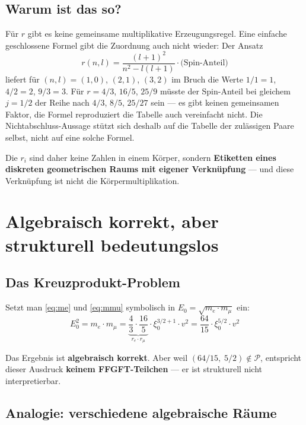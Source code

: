 \subsection{Warum ist das so?}

Für $r$ gibt es keine gemeinsame multiplikative Erzeugungsregel.
Eine einfache geschlossene Formel gibt die Zuordnung auch nicht wieder:
Der Ansatz
\[
  r(n,l) = \frac{(l+1)^2}{n^2 - l(l+1)} \cdot \text{(Spin-Anteil)}
\]
liefert für $(n,l) = (1,0)$, $(2,1)$, $(3,2)$ im Bruch die Werte
$1/1 = 1$, $4/2 = 2$, $9/3 = 3$. Für $r = 4/3$, $16/5$, $25/9$ müsste der
Spin-Anteil bei gleichem $j = 1/2$ der Reihe nach $4/3$, $8/5$, $25/27$
sein --- es gibt keinen gemeinsamen Faktor, die Formel reproduziert die
Tabelle auch vereinfacht nicht. Die Nichtabschluss-Aussage stützt sich
deshalb auf die Tabelle der zulässigen Paare selbst, nicht auf eine
solche Formel.

Die $r_i$ sind daher keine Zahlen in einem Körper, sondern
\textbf{Etiketten eines diskreten geometrischen Raums mit eigener
Verknüpfung} --- und diese Verknüpfung ist nicht die Körpermultiplikation.

\section{Algebraisch korrekt, aber strukturell bedeutungslos}

\subsection{Das Kreuzprodukt-Problem}

Setzt man \eqref{eq:me} und \eqref{eq:mmu} symbolisch in
$E_0 = \sqrt{m_e \cdot m_\mu}$ ein:
\begin{equation}
  E_0^2 = m_e \cdot m_\mu
        = \underbrace{\frac{4}{3} \cdot \frac{16}{5}}_{r_e \cdot r_\mu}
          \cdot \xi_0^{3/2 + 1} \cdot v^2
        = \frac{64}{15} \cdot \xi_0^{5/2} \cdot v^2
  \label{eq:kreuz}
\end{equation}

Das Ergebnis ist \textbf{algebraisch korrekt}. Aber weil
$(64/15,\;5/2) \notin \mathcal{P}$, entspricht dieser Ausdruck
\textbf{keinem FFGFT-Teilchen} --- er ist strukturell nicht
interpretierbar.

\subsection{Analogie: verschiedene algebraische Räume}

